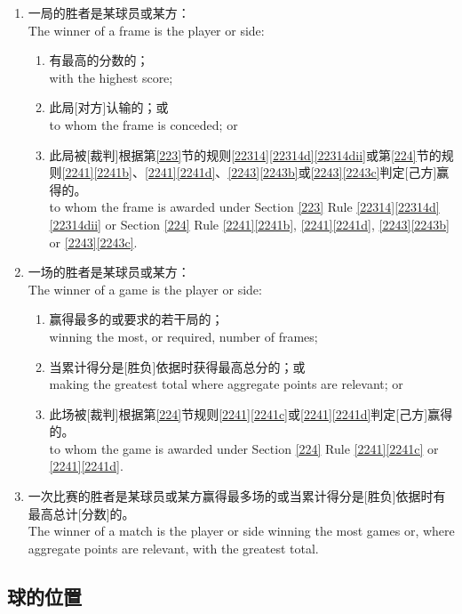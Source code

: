 \begin{enumerate}[label=(\alph*)]
    \item 一局的胜者是某球员或某方：\\
    The winner of a frame is the player or side:
    \begin{enumerate}[label=(\roman*)]
        \item 有最高的分数的；\\
        with the highest score;
        \item 此局[对方]认输的；或\\
        to whom the frame is conceded; or
        \item 此局被[裁判]根据第\ref{223}节的规则\ref{22314}\ref{22314d}\ref{22314dii}或第\ref{224}节的规则\ref{2241}\ref{2241b}、\ref{2241}\ref{2241d}、\ref{2243}\ref{2243b}或\ref{2243}\ref{2243c}判定[己方]赢得的。\\
        to whom the frame is awarded under Section \ref{223} Rule \ref{22314}\ref{22314d} \ref{22314dii} or Section \ref{224} Rule \ref{2241}\ref{2241b}, \ref{2241}\ref{2241d}, \ref{2243}\ref{2243b} or \ref{2243}\ref{2243c}.
    \end{enumerate}
    \item 一场的胜者是某球员或某方：\\
    The winner of a game is the player or side:
    \begin{enumerate}[label=(\roman*)]
        \item 赢得最多的或要求的若干局的；\\
        winning the most, or required, number of frames;
        \item 当累计得分是[胜负]依据时获得最高总分的；或\\
        making the greatest total where aggregate points are relevant; or
        \item 此场被[裁判]根据第\ref{224}节规则\ref{2241}\ref{2241c}或\ref{2241}\ref{2241d}判定[己方]赢得的。\\
        to whom the game is awarded under Section \ref{224} Rule \ref{2241}\ref{2241c} or \ref{2241}\ref{2241d}.
    \end{enumerate}
    \item \label{2231h}一次比赛的胜者是某球员或某方赢得最多场的或当累计得分是[胜负]依据时有最高总计[分数]的。\\
    The winner of a match is the player or side winning the most games or, where aggregate points are relevant, with the greatest total.
\end{enumerate}

\subsection{球的位置}\label{2232}

